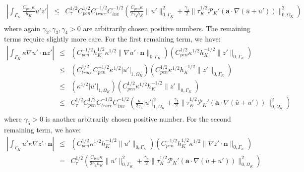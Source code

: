 \documentclass[11pt]{article}
\newenvironment{proof}[1][Proof]{\begin{trivlist}
\item[\hskip \labelsep {\bfseries #1}]}{\end{trivlist}}
\begin{document}
\begin{proof}
\begin{eqnarray}
\end{eqnarray}
\begin{eqnarray}
\left| \int_{\Gamma_K} \frac{C_{pen} \kappa}{h_K} u' z' \right| & \leq & C^{1/2}_{\tau} C^{1/2}_{pen} C^{-1/2}_{trace} C^{-1/2}_{inv} \left( \frac{C_{pen} \kappa}{2\gamma_4 h_K} \| u' \|_{0,\Gamma_K}^2 + \frac{\gamma_4}{2} \| \tau^{1/2}_K \mathcal{P}_K' \left( \bm{a} \cdot \nabla \left( \bar{u} + u' \right) \right) \|_{0,\Omega_K}^2 \right) \nonumber \\
\end{eqnarray}
where again $\gamma_2, \gamma_3, \gamma_4 > 0$ are arbitrarily chosen positive numbers.  The remaining terms require slightly more care.  For the first remaining term, we have:
\begin{eqnarray}
\left| \int_{\Gamma_K} \kappa \nabla u' \cdot \bm{n} z' \right| & \leq & \left( C_{pen}^{-1/2} h_K^{1/2} \kappa^{1/2} \| \nabla u' \cdot \bm{n} \|_{0,\Gamma_K} \right) \left( C_{pen}^{1/2} \kappa^{1/2} h_K^{-1/2} \| z' \|_{0,\Gamma_K} \right) \nonumber \\
& \leq & \left( C_{trace}^{1/2} C_{pen}^{-1/2} \kappa^{1/2} | u' |_{1,\Omega_K} \right) \left( C_{pen}^{1/2} \kappa^{1/2} h_K^{-1/2} \| z' \|_{0,\Gamma_K} \right) \nonumber \\
& \leq & \left( \kappa^{1/2} | u' |_{1,\Omega_K} \right) \left( C_{pen}^{1/2} \kappa^{1/2} h_K^{-1/2} \| z' \|_{0,\Gamma_K} \right) \nonumber \\
& \leq & C^{1/2}_{\tau} C^{1/2}_{pen} C^{-1/2}_{trace} C^{-1/2}_{inv} \left( \frac{\kappa}{2\gamma_5} | u' |_{1,\Omega_K}^2 + \frac{\gamma_5}{2} \| \tau^{1/2}_K \mathcal{P}_K' \left( \bm{a} \cdot \nabla \left( \bar{u} + u' \right) \right) \|_{0,\Omega_K}^2 \right) \nonumber \\
\end{eqnarray}
where $\gamma_5 > 0$ is another arbitrarily chosen positive number.  For the second remaining term, we have:
\begin{eqnarray}
\left| \int_{\Gamma_K} u' \kappa \nabla z' \cdot \bm{n} \right| & \leq & \left( C_{pen}^{1/2} \kappa^{1/2} h_K^{-1/2} \| u' \|_{0,\Gamma_K} \right) \left( C_{pen}^{-1/2} h_K^{1/2} \kappa^{1/2} \| \nabla z' \cdot \bm{n} \|_{0,\Gamma_K} \right) \nonumber \\
& = & C_{\tau}^{1/2} \left( \frac{C_{pen} \kappa}{2\gamma_6 h_K} \| u' \|_{0,\Gamma_K}^2 + \frac{\gamma_6}{2} \| \tau^{1/2}_K \mathcal{P}_K' \left( \bm{a} \cdot \nabla \left( \bar{u} + u' \right) \right) \|_{0,\Omega_K}^2 \right) \nonumber \\

\end{eqnarray}
\end{proof}
\end{document}
